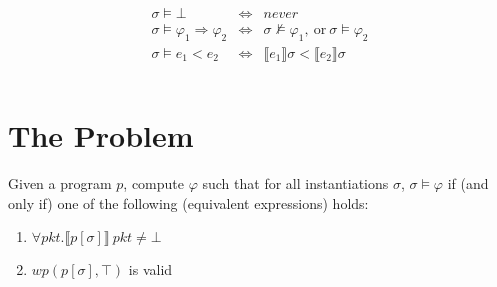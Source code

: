 \documentclass{article}
\newcommand{\NumRows}{\mathsf{numrows}}
\begin{document}
\[
  \begin{array}{rcl}
    \sigma \models \bot &\iff & \mathit{never} \\
    \sigma \models \varphi_1 \Rightarrow \varphi_2 & \iff & \sigma \not\models \varphi_1,~\text{or}~\sigma \models \varphi_2 \\
    \sigma \models e_1 < e_2 &\iff& \llbracket e_1 \rrbracket \sigma < \llbracket e_2 \rrbracket \sigma \\\\
  \end{array}
\]

\section{The Problem}

Given a program $p$, compute $\varphi$ such that for all
instantiations $\sigma$, $\sigma \models \varphi$ if (and
only if) one of the following (equivalent expressions) holds:
\begin{enumerate}
\item $\forall \mathit{pkt}. \llbracket p[\sigma]\rrbracket~\mathit{pkt} \neq \bot$
\item $\mathit{wp}(p[\sigma], \top)$ is valid
\end{enumerate}
\end{document}
